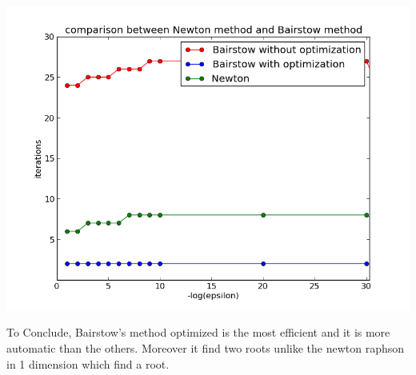 \documentclass[22pt]{report}
\begin{document}
\includegraphics[scale = 0.5]{figure1.png} 

To Conclude, Bairstow's method optimized  is the most efficient and it is more automatic than the others. Moreover it find two roots unlike the newton raphson in 1 dimension which find a root. 

 
\end{document}
